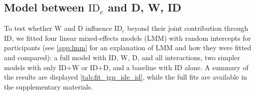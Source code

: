 \documentclass[acmlarge, manuscript,review]{acmart}
\newcommand{\mt}{\ensuremath{{\text{MT}}}\xspace}
\newcommand{\ide}{\ensuremath{{\text{ID}_e}}\xspace}
\begin{document}









\subsection{Model between \ide and D, W, ID\label{sub:jgp_id}} 
To test whether W and D influence \ide beyond their joint contribution through ID, we fitted four linear mixed-effects models (LMM) with random intercepts for participants (see \autoref{app:lmm} for an explanation of LMM and how they were fitted and compared): a full model with ID, W, D, and all interactions, two simpler models with only ID+W or ID+D, and a baseline with ID alone.
A summary of the results are displayed \autoref{tab:fit_jgp_ide_id}, while the full fits are available in the supplementary materials.
\end{document}
